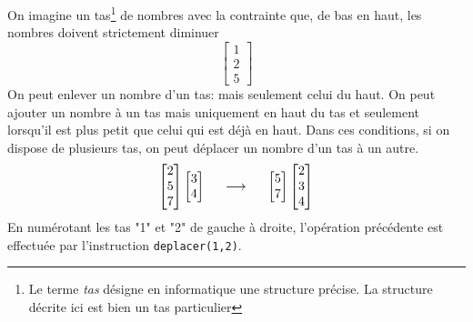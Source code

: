 On imagine un tas\footnote{Le terme \emph{tas} désigne en informatique une structure précise. La structure décrite ici est bien un tas particulier} de nombres avec la contrainte que, de bas en haut, les nombres doivent strictement diminuer 
\begin{displaymath}
\begin{bmatrix}
1 \\ 2  \\ 5                                                                                                          
\end{bmatrix} 
\end{displaymath}
On peut enlever un nombre d'un tas: mais seulement celui du haut. On peut ajouter un nombre à un tas mais uniquement en haut du tas et seulement lorsqu'il est plus petit que celui qui est déjà en haut. Dans ces conditions, si on dispose de plusieurs tas, on peut déplacer un nombre d'un tas à un autre.
\begin{displaymath}
\begin{bmatrix}
2 \\ 5  \\ 7                                                                                                          
\end{bmatrix} 
\begin{bmatrix}
 3  \\ 4                                                                                                          
\end{bmatrix} 
\hspace{0.5cm} \longrightarrow \hspace{0.5cm}
\begin{bmatrix}
 5  \\ 7                                                                                                          
\end{bmatrix} 
\begin{bmatrix}
2 \\ 3  \\ 4                                                                                                          
\end{bmatrix} 
\end{displaymath}
En numérotant les tas "1" et "2" de gauche à droite, l'opération précédente est effectuée par l'instruction \verb|deplacer(1,2)|.
